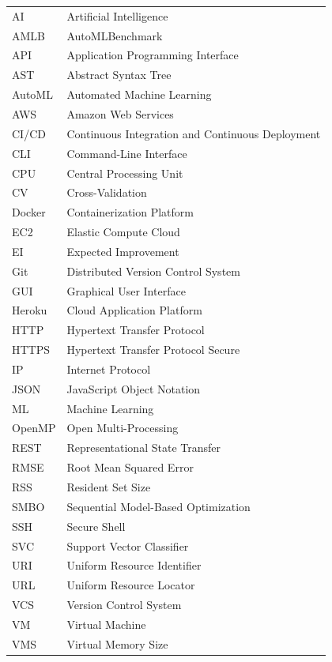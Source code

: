 \documentclass[12pt,a4paper]{report}
\begin{document}
\begin{tabular}{ll}
AI & Artificial Intelligence \\
AMLB & AutoMLBenchmark \\
API & Application Programming Interface \\
AST & Abstract Syntax Tree \\
AutoML & Automated Machine Learning \\
AWS & Amazon Web Services \\
CI/CD & Continuous Integration and Continuous Deployment \\
CLI & Command-Line Interface \\
CPU & Central Processing Unit \\
CV & Cross-Validation \\
Docker & Containerization Platform \\
EC2 & Elastic Compute Cloud \\
EI & Expected Improvement \\
Git & Distributed Version Control System \\
GUI & Graphical User Interface \\
Heroku & Cloud Application Platform \\
HTTP & Hypertext Transfer Protocol \\
HTTPS & Hypertext Transfer Protocol Secure \\
IP & Internet Protocol \\
JSON & JavaScript Object Notation \\
ML & Machine Learning \\
OpenMP & Open Multi-Processing \\
REST & Representational State Transfer \\
RMSE & Root Mean Squared Error \\
RSS & Resident Set Size \\
SMBO & Sequential Model-Based Optimization \\
SSH & Secure Shell \\
SVC & Support Vector Classifier \\
URI & Uniform Resource Identifier \\
URL & Uniform Resource Locator \\
VCS & Version Control System \\
VM & Virtual Machine \\
VMS & Virtual Memory Size \\
\end{tabular}
\end{document}
